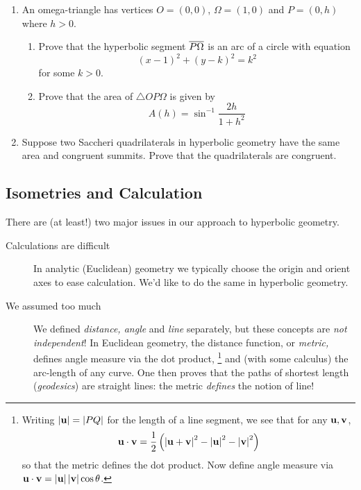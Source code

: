\begin{exercises}
\begin{enumerate}
	  \item An omega-triangle has vertices $O=(0,0)$, $\Omega=(1,0)$ and $P=(0,h)$ where $h>0$.
	  \begin{enumerate}
	    \item Prove that the hyperbolic segment $\overline{P\Omega}$ is an arc of a circle with equation
	    \[
	    	(x-1)^2+(y-k)^2=k^2
	    \]
	    for some $k>0$.
	    \item Prove that the area of $\triangle OP\Omega$ is given by
			\[
				A(h)=\sin^{-1}\dfrac{2h}{1+h^2}
			\]
		\end{enumerate}
		
		
		\item Suppose two Saccheri quadrilaterals in hyperbolic geometry have the same area and congruent summits. Prove that the quadrilaterals are congruent.
	
	\end{enumerate}
\end{exercises}

\clearpage




\subsection{Isometries and Calculation}\label{sec:hyperiso}

There are (at least!) two major issues in our approach to hyperbolic geometry.

\begin{description}
	\item[Calculations are difficult] In analytic (Euclidean) geometry we typically choose the origin and orient axes to ease calculation. We'd like to do the same in hyperbolic geometry.
	\item[We assumed too much] We defined \emph{distance, angle} and \emph{line} separately, but these concepts are \emph{not independent}! In Euclidean geometry, the distance function, or \emph{metric,} defines angle measure via the dot product,%
	\footnote{%
		Writing $\left| {\mathbf{u}}\right|=\left| PQ\right|$ for the length of a line segment, we see that for any ${\mathbf{u}},{\mathbf{v}}$,
		\[
			{\mathbf{u}}\cdot{\mathbf{v}}=\frac 12\left(\left| {\mathbf{u}}+{\mathbf{v}}\right|^2-\left| {\mathbf{u}}\right|^2-\left| {\mathbf{v}}\right|^2\right)
		\]
		so that the metric defines the dot product. Now define angle measure via ${\mathbf{u}}\cdot{\mathbf{v}}=\left| {\mathbf{u}}\right|\left| {\mathbf{v}}\right|\cos\theta$.
	}%
	and (with some calculus) the arc-length of any curve. One then proves that the paths of shortest length (\emph{geodesics}) are straight lines: the metric \emph{defines} the notion of line!
\end{description}

